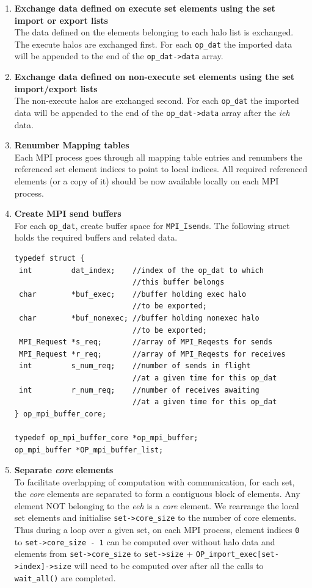 \documentclass[11pt]{article}
\begin{document}
\begin{enumerate}
\item \textbf{Exchange data defined on execute set elements using the set import
or export lists}\\
The data defined on the elements belonging to each halo list is exchanged. The
execute halos are exchanged first. For each \texttt{op\_dat} the imported data
will be appended to the end of the \texttt{op\_dat->data} array.

\item \textbf{Exchange data defined on non-execute set elements using the set
import/export lists}\\
The non-execute halos are exchanged second. For each \texttt{op\_dat} the
imported data will be appended to the end of the \texttt{op\_dat->data} array
after the \textit{ieh} data.

\item \textbf{Renumber Mapping tables}\\
Each MPI process goes through all mapping table entries and renumbers the
referenced set element indices to point to local indices. All required
referenced elements (or a copy of it) should be now available locally on each MPI process.

\item \textbf{Create MPI send buffers}\\
For each \texttt{op\_dat}, create buffer space for \texttt{MPI\_Isend}s.
The following struct holds the required buffers and related data.
\begin{verbatim}
typedef struct {
 int         dat_index;    //index of the op_dat to which
                           //this buffer belongs
 char        *buf_exec;    //buffer holding exec halo
                           //to be exported;
 char        *buf_nonexec; //buffer holding nonexec halo
                           //to be exported;
 MPI_Request *s_req;       //array of MPI_Reqests for sends
 MPI_Request *r_req;       //array of MPI_Reqests for receives
 int         s_num_req;    //number of sends in flight
                           //at a given time for this op_dat
 int         r_num_req;    //number of receives awaiting
                           //at a given time for this op_dat
} op_mpi_buffer_core;

typedef op_mpi_buffer_core *op_mpi_buffer;
op_mpi_buffer *OP_mpi_buffer_list;
\end{verbatim}

\item \textbf{Separate \textit{core} elements}\\
To facilitate overlapping of computation with communication, for each set, the
\textit{core} elements are separated to form a contiguous block of elements. Any
element NOT belonging to the \textit{eeh} is a \textit{core} element. We
rearrange the local set elements and initialise \texttt{set->core\_size} to the
number of core elements. Thus during a loop over a given set, on each MPI
process, element indices \texttt{0} to \texttt{set->core\_size - 1} can be
computed over without halo data and elements from \texttt{set->core\_size}
to \texttt{set->size} + \texttt{OP\_import\_exec[set->index]->size} will need to
be computed over after all the calls to \texttt{wait\_all()} are completed.


\end{enumerate}
\end{document}
